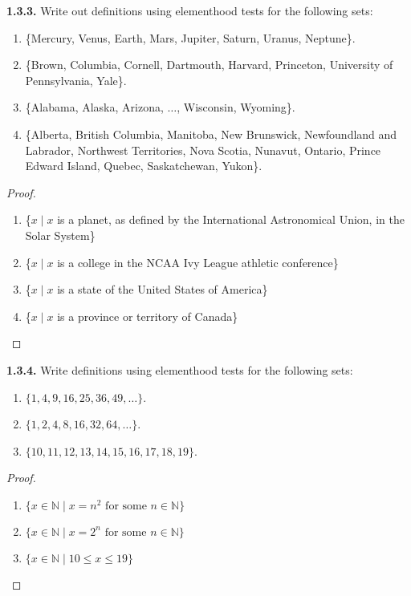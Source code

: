 \documentclass[12pt]{amsart}
\newenvironment{statement}[1]{\smallskip\noindent\color[rgb]{.6627, .3529, .6314} {\bf #1.}}{}
\theoremstyle{definition}
\theoremstyle{remark}
\newcommand{\BN}{\mathbb N}
\begin{document}
\begin{statement}{1.3.3}
Write out definitions using elementhood tests for the following sets:
\begin{enumerate}
	\item \{Mercury, Venus, Earth, Mars, Jupiter, Saturn, Uranus, Neptune\}.
	\item \{Brown, Columbia, Cornell, Dartmouth, Harvard, Princeton, University of Pennsylvania, Yale\}.
	\item \{Alabama, Alaska, Arizona, $\dots$, Wisconsin, Wyoming\}.
	\item \{Alberta, British Columbia, Manitoba, New Brunswick, Newfoundland and Labrador, Northwest Territories, Nova Scotia, Nunavut, Ontario, Prince Edward Island, Quebec, Saskatchewan, Yukon\}.
\end{enumerate}
\end{statement}

\begin{proof}
\hfill
\begin{enumerate}
	\item \{$x \mid x$ is a planet, as defined by the International Astronomical Union, in the Solar System\}
	
	\item \{$x \mid x$ is a college in the NCAA Ivy League athletic conference\}
	
	\item \{$x \mid x$ is a state of the United States of America\}
	
	\item \{$x \mid x$ is a province or territory of Canada\}
\end{enumerate}
\end{proof}


\begin{statement}{1.3.4}
Write definitions using elementhood tests for the following sets:
\begin{enumerate}
	\item $\{ 1, 4, 9, 16, 25, 36, 49, \dots \}$.
	\item $\{ 1, 2,4, 8, 16, 32, 64, \dots \}$.
	\item $\{10, 11, 12, 13, 14, 15, 16, 17, 18, 19 \}$.
\end{enumerate}
\end{statement}

\begin{proof}
\hfill
\begin{enumerate}
	\item $\{ x \in \BN \mid x = n^2 \text{ for some } n \in \BN \}$
	
	\item $\{ x \in \BN \mid x = 2^n \text{ for some } n \in \BN \}$
	
	\item $\{ x \in \BN \mid 10 \leq x \leq 19 \}$
\end{enumerate}
\end{proof}
\end{document}

